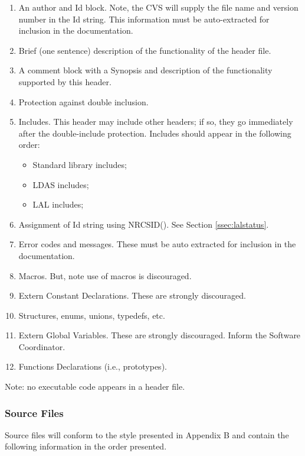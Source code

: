\documentclass[]{ligodcc}
\begin{document}
\begin{enumerate}
\item
An author and Id block. Note, the CVS will supply the file name and
version number in the Id string. This information must be
auto-extracted for inclusion in the documentation.

\item
Brief (one sentence) description of the functionality of the header
file.

\item
A comment block with a Synopsis and description of the functionality
supported by this header.

\item
Protection against double inclusion.

\item
Includes. This header may include other headers; if so, they
go immediately after the double-include protection. Includes should
appear in the following order:
\begin{itemize}
    \item Standard library includes;
    \item LDAS includes;
    \item LAL includes;
\end{itemize}


\item
Assignment of Id string using NRCSID().  See Section
\ref{ssec:lalstatus}.
\item
Error codes and messages.  These must be auto extracted for
inclusion in the documentation.
\item
Macros. But, note use of macros is discouraged.
\item
Extern Constant Declarations. These are strongly discouraged.
\item
Structures, enums, unions,  typedefs, etc.
\item
Extern Global Variables. These are strongly discouraged.
Inform the Software Coordinator.
\item
Functions Declarations (i.e., prototypes).

\end{enumerate}

\noindent
Note: no executable code appears in a header file.

\subsubsection{Source Files}

Source files will conform to the style presented in  Appendix B and
contain the following information in the order presented.
\end{document}
